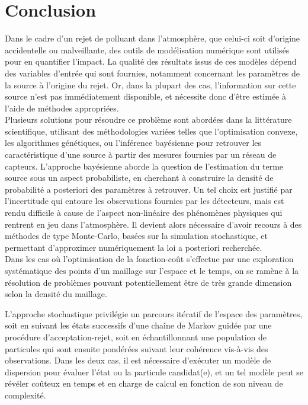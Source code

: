 \chapter{Conclusion}

Dans le cadre d'un rejet de polluant dans l'atmosphère, que celui-ci soit d'origine accidentelle ou malveillante, des outils de modélisation numérique sont utilisés pour en quantifier l'impact. La qualité des résultats issus de ces modèles dépend des variables d'entrée qui sont fournies, notamment concernant les paramètres de la source à l'origine du rejet. Or, dans la plupart des cas, l'information sur cette source n'est pas immédiatement disponible, et nécessite donc d'être estimée à l'aide de méthodes appropriées. \\

Plusieurs solutions pour résoudre ce problème sont abordées dans la littérature scientifique, utilisant des méthodologies variées telles que l'optimisation convexe, les algorithmes génétiques, ou l'inférence bayésienne pour retrouver les caractéristique d'une source à partir des mesures fournies par un réseau de capteurs. L'approche bayésienne aborde la question de l'estimation du terme source sous un aspect probabiliste, en cherchant à construire la densité de probabilité a posteriori des paramètres à retrouver. Un tel choix est justifié par l'incertitude qui entoure les observations fournies par les détecteurs, mais est rendu difficile à cause de l'aspect non-linéaire des phénomènes physiques qui rentrent en jeu dans l'atmosphère. Il devient alors nécessaire d'avoir recours à des méthodes de type Monte-Carlo, basées sur la simulation stochastique, et permettant d'approximer numériquement la loi a posteriori recherchée. \\

{Dans les cas où l'optimisation de la fonction-coût s'effectue par une exploration systématique des points d'un maillage sur l'espace et le temps, on se ramène à la résolution de problèmes pouvant potentiellement être de très grande dimension selon la densité du maillage.} 

L'approche stochastique privilégie un parcours itératif de l'espace des paramètres, soit en suivant les états successifs d'une chaîne de Markov guidée par une procédure d'acceptation-rejet, soit en échantillonnant une population de particules qui sont ensuite pondérées suivant leur cohérence vis-à-vis des observations. Dans les deux cas, il est nécessaire d'exécuter un modèle de dispersion pour évaluer l'état ou la particule candidat(e), et un tel modèle peut se révéler coûteux en temps et en charge de calcul en fonction de son niveau de complexité. \\

